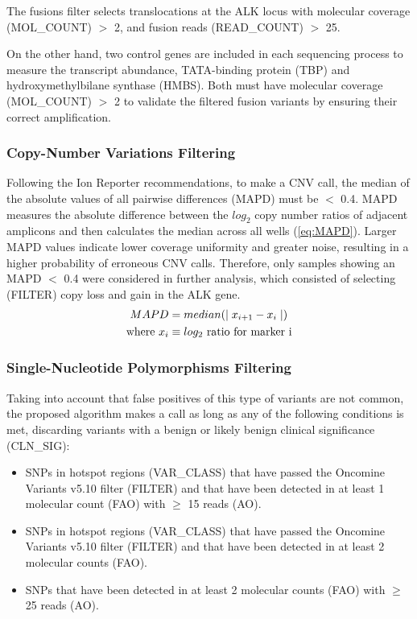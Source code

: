 The fusions filter selects translocations at the ALK locus with molecular coverage (MOL\_COUNT) $>$ 2, and fusion reads (READ\_COUNT) $>$ 25.

On the other hand, two control genes are included in each sequencing process to measure the transcript abundance, TATA-binding protein (TBP) and hydroxymethylbilane synthase (HMBS). Both must have molecular coverage (MOL\_COUNT) $>$ 2 to validate the filtered fusion variants by ensuring their correct amplification.

\subsubsection{Copy-Number Variations Filtering}

Following the Ion Reporter\texttrademark{} recommendations, to make a CNV call, the median of the absolute values of all pairwise differences (MAPD) must be $<$ 0.4. MAPD measures the absolute difference between the $log_2$ copy number ratios of adjacent amplicons and then calculates the median across all wells (\autoref{eq:MAPD}). Larger MAPD values indicate lower coverage uniformity and greater noise, resulting in a higher probability of erroneous CNV calls. Therefore, only samples showing an MAPD $<$ 0.4 were considered in further analysis, which consisted of selecting (FILTER) copy loss and gain in the ALK gene.
\begin{align} \label{eq:MAPD}
    MAPD &= median(\mid x_{i+1}-x_i \mid) \\
    \text{where}~  
    x_i &\equiv \text{$log_2$ ratio for marker i} \notag
\end{align}

\subsubsection{Single-Nucleotide Polymorphisms Filtering}

Taking into account that false positives of this type of variants are not common, the proposed algorithm makes a call as long as any of the following conditions is met, discarding variants with a benign or likely benign clinical significance (CLN\_SIG):
\begin{itemize}
    \item SNPs in hotspot regions (VAR\_CLASS) that have passed the Oncomine\texttrademark{} Variants v5.10 filter (FILTER) and that have been detected in at least 1 molecular count (FAO) with $\ge$ 15 reads (AO).
    \item SNPs in hotspot regions (VAR\_CLASS) that have passed the Oncomine\texttrademark{} Variants v5.10 filter (FILTER) and that have been detected in at least 2 molecular counts (FAO).
    \item SNPs that have been detected in at least 2 molecular counts (FAO) with $\ge$ 25 reads (AO).
\end{itemize}

